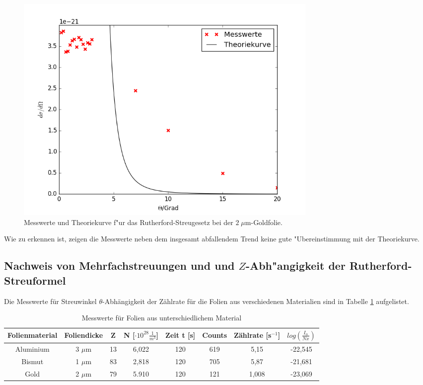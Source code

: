   \begin{figure}
    \centering
    \includegraphics[width=15cm]{skripte/ruther.png}
    \caption{Messwerte und Theoriekurve f"ur das Rutherford-Streugesetz bei der $2\; \mu \text{m}$-Goldfolie.}
    \label{plot:ruther}
  \end{figure}

  Wie zu erkennen ist, zeigen die Messwerte neben dem insgesamt abfallendem Trend keine gute "Ubereinstimmung mit der Theoriekurve.

  \newpage



  \subsection{Nachweis von Mehrfachstreuungen und und $Z$-Abh"angigkeit der Rutherford-Streuformel}



Die Messwerte für Streuwinkel $\theta$-Abhängigkeit der Zählrate für die Folien aus verschiedenen Materialien sind in Tabelle \ref{tab:werte} aufgelistet.

\begin{table}[H]
\centering
\begin{tabular}{c|c c c c c c c}

	Folienmaterial & Foliendicke & Z & N [$\cdot 10^{28} \frac{1}{m^3}$]& Zeit t [s]& Counts & Zählrate [s$^{-1}$] & $log(\frac{I_\alpha}{Nx})$ \\
	\hline
	Aluminium & 3 $\mu$m & 13 & 6,022 & 120  & 619 & 5,15 & -22,545 \\

	Bismut &1 $\mu$m & 83 & 2,818 & 120 & 705 & 5,87 & -21,681\\

	Gold & 2 $\mu$m& 79 &  5.910 & 120 & 121 & 1,008 & -23,069\\

\end{tabular}
	\caption{Messwerte für Folien aus unterschiedlichem Material}
	\label{tab:werte}
\end{table}


